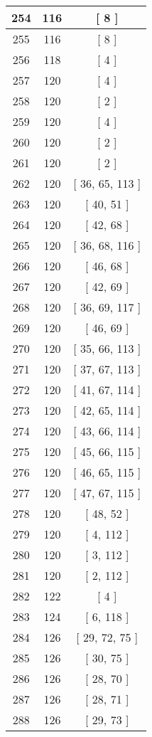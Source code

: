 \begin{center}
\begin{longtable}[H]{|| c c c ||}
\hline
254 & 116 & [ 8 ] \\ 
\hline
255 & 116 & [ 8 ] \\ 
\hline
256 & 118 & [ 4 ] \\ 
\hline
257 & 120 & [ 4 ] \\ 
\hline
258 & 120 & [ 2 ] \\ 
\hline
259 & 120 & [ 4 ] \\ 
\hline
260 & 120 & [ 2 ] \\ 
\hline
261 & 120 & [ 2 ] \\ 
\hline
262 & 120 & [ 36, 65, 113 ] \\ 
\hline
263 & 120 & [ 40, 51 ] \\ 
\hline
264 & 120 & [ 42, 68 ] \\ 
\hline
265 & 120 & [ 36, 68, 116 ] \\ 
\hline
266 & 120 & [ 46, 68 ] \\ 
\hline
267 & 120 & [ 42, 69 ] \\ 
\hline
268 & 120 & [ 36, 69, 117 ] \\ 
\hline
269 & 120 & [ 46, 69 ] \\ 
\hline
270 & 120 & [ 35, 66, 113 ] \\ 
\hline
271 & 120 & [ 37, 67, 113 ] \\ 
\hline
272 & 120 & [ 41, 67, 114 ] \\ 
\hline
273 & 120 & [ 42, 65, 114 ] \\ 
\hline
274 & 120 & [ 43, 66, 114 ] \\ 
\hline
275 & 120 & [ 45, 66, 115 ] \\ 
\hline
276 & 120 & [ 46, 65, 115 ] \\ 
\hline
277 & 120 & [ 47, 67, 115 ] \\ 
\hline
278 & 120 & [ 48, 52 ] \\ 
\hline
279 & 120 & [ 4, 112 ] \\ 
\hline
280 & 120 & [ 3, 112 ] \\ 
\hline
281 & 120 & [ 2, 112 ] \\ 
\hline
282 & 122 & [ 4 ] \\ 
\hline
283 & 124 & [ 6, 118 ] \\ 
\hline
284 & 126 & [ 29, 72, 75 ] \\ 
\hline
285 & 126 & [ 30, 75 ] \\ 
\hline
286 & 126 & [ 28, 70 ] \\ 
\hline
287 & 126 & [ 28, 71 ] \\ 
\hline
288 & 126 & [ 29, 73 ] \\ 

\end{longtable}
\end{center}

